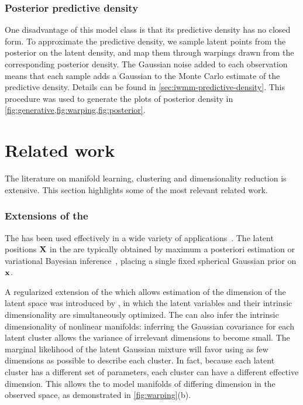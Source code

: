 \subsubsection{Posterior predictive density}

One disadvantage of this model class is that its predictive density has no closed form.
To approximate the predictive density, we sample latent points from the posterior on the latent density, and map them through warpings drawn from the corresponding posterior density.
The Gaussian noise added to each observation means that each sample adds a Gaussian to the Monte Carlo estimate of the predictive density.
Details can be found in \cref{sec:iwmm-predictive-density}.
This procedure was used to generate the plots of posterior density in \cref{fig:generative,fig:warping,fig:posterior}.





\section{Related work}
\label{sec:iwmm-related-work}

The literature on manifold learning, clustering and dimensionality reduction is extensive.
This section highlights some of the most relevant related work.

\subsubsection{Extensions of the \sgplvm{}}

The \gplvm{} has been used effectively in a wide variety of applications~\citep{lawrence2004gaussian,salzmann2008local,lawrence2009non}.
The latent positions $\mathbf{X}$ in the \gplvm{} are typically obtained by maximum a posteriori estimation or variational Bayesian inference~\citep{titsias2010bayesian}, placing a single fixed spherical Gaussian prior on ${\bf{x}}$.

A regularized extension of the \gplvm{} which allows estimation of the dimension of the latent space was introduced by \citet{geiger2009rank}, in which the latent variables and their intrinsic dimensionality are simultaneously optimized.
The \iwmm{} can also infer the intrinsic dimensionality of nonlinear manifolds:
inferring the Gaussian covariance for each latent cluster allows the variance of irrelevant dimensions to become small.
The marginal likelihood of the latent Gaussian mixture will favor using as few dimensions as possible to describe each cluster.
In fact, because each latent cluster has a different set of parameters, each cluster can have a different effective dimension.
This allows the \iwmm{} to model manifolds of differing dimension in the observed space, as demonstrated in \cref{fig:warping}(b).


